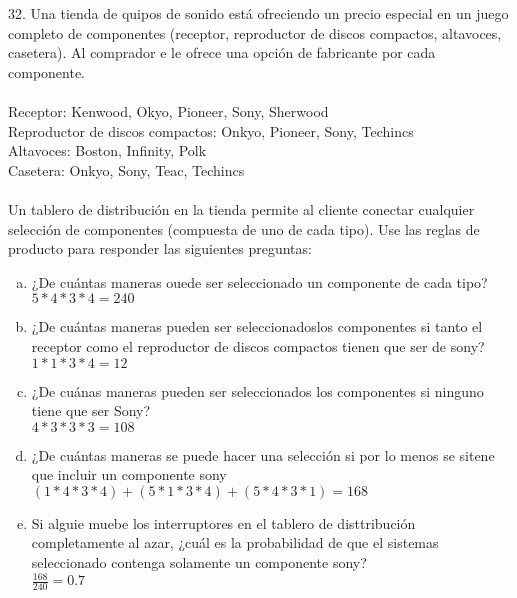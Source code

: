 \documentclass[12pt, letterpaper, spanish]{article}
\begin{document}
	32. Una tienda de quipos de sonido está ofreciendo un precio especial en un juego completo de componentes (receptor, reproductor de discos compactos, altavoces, casetera). Al comprador e le ofrece una opción de fabricante por cada componente.\\ \\
	Receptor: Kenwood, Okyo, Pioneer, Sony, Sherwood\\
	Reproductor de discos compactos: Onkyo, Pioneer, Sony, Techincs\\
	Altavoces: Boston, Infinity, Polk\\
	Casetera: Onkyo, Sony, Teac, Techincs\\ \\
	Un tablero de distribución en la tienda permite al cliente conectar cualquier selección de componentes (compuesta de uno de cada tipo). Use las reglas de producto para responder las siguientes preguntas:\\
	\begin{enumerate}[a)]
		\item ¿De cuántas maneras ouede ser seleccionado un componente de cada tipo?\\
		$5*4*3*4=240$
		\item ¿De cuántas maneras pueden ser seleccionadoslos componentes si tanto el receptor como el reproductor de discos compactos tienen que ser de sony?\\
		$1*1*3*4=12$
		\item ¿De cuánas maneras pueden ser seleccionados los componentes si ninguno tiene que ser Sony?\\
		$4*3*3*3=108$
		\item ¿De cuántas maneras se puede hacer una selección si por lo menos se sitene que incluir un componente sony\\
		$(1*4*3*4)+(5*1*3*4)+(5*4*3*1)=168$
		\item Si alguie muebe los interruptores en el tablero de disttribución completamente al azar, ¿cuál es la probabilidad de que el sistemas seleccionado contenga solamente un componente sony?\\
		$\frac{168}{240}=0.7$\\
	\end{enumerate}
\end{document}
